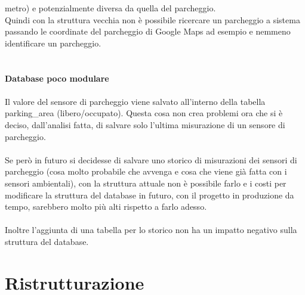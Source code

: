 metro) e potenzialmente diversa da quella del parcheggio. 
\\
Quindi con la struttura vecchia non è possibile ricercare un parcheggio a sistema passando le coordinate del parcheggio di Google
Maps ad esempio e nemmeno identificare un parcheggio.
\\\\\\
\textbf{Database poco modulare}
\\\\
Il valore del sensore di parcheggio viene salvato all'interno della tabella parking\_area (libero/occupato). Questa cosa non crea problemi ora che 
si è deciso, dall'analisi fatta, di salvare solo l'ultima misurazione di un sensore di parcheggio.
\\\\
Se però in futuro si decidesse di salvare uno storico di misurazioni dei sensori di parcheggio (cosa molto probabile che
avvenga e cosa che viene già fatta con i sensori ambientali), con la struttura attuale non è possibile farlo e i costi
per modificare la struttura del database in futuro, con il progetto in produzione da tempo, sarebbero molto più
alti rispetto a farlo adesso.
\\\\
Inoltre l'aggiunta di una tabella per lo storico non ha un impatto negativo sulla struttura del database.

\section{Ristrutturazione}

